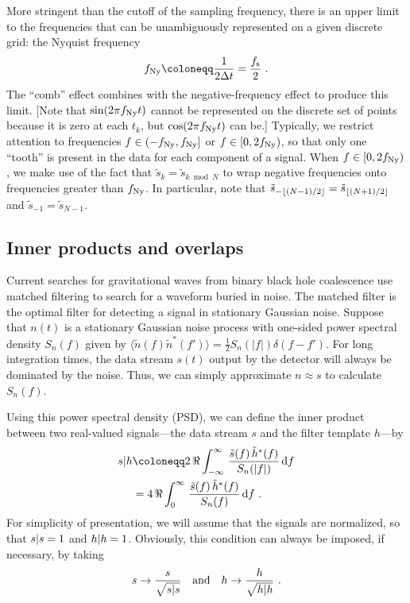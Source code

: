 \documentclass[aps, prd, amsfonts, amssymb, amsmath, %
nofootinbib]{revtex4}
\begin{document}
More stringent than the cutoff of the sampling frequency, there is an
upper limit to the frequencies that can be unambiguously represented
on a given discrete grid: the Nyquist frequency
\begin{equation}
  \label{eq:NyquistFrequency}
  \fNy \coloneqq \frac{1}{2\Delta t} = \frac{\fsamp}{2}\ .
\end{equation}
The ``comb'' effect combines with the negative-frequency effect to
produce this limit.  [Note that $\sin(2 \pi f_{\mathrm{Ny}} t)$ cannot be
represented on the discrete set of points because it is zero at each
$t_{k}$, but $\cos(2 \pi f_{\mathrm{Ny}} t)$ can be.]  Typically, we restrict
attention to frequencies $f \in (-f_{\mathrm{Ny}}, f_{\mathrm{Ny}}]$ or $f \in [0, 2f_{\mathrm{Ny}})$,
so that only one ``tooth'' is present in the data for each component
of a signal.  When $f \in [0, 2f_{\mathrm{Ny}})$, we make use of the fact that
$\tilde{s}_{k} = \tilde{s}_{k \bmod N}$ to wrap negative frequencies
onto frequencies greater than $f_{\mathrm{Ny}}$.  In particular, note that
$\tilde{s}_{-\left\lfloor{(N-1)/2}\right\rfloor} = \tilde{s}_{\left\lfloor{(N+1)/2}\right\rfloor}$ and
$\tilde{s}_{-1} = \tilde{s}_{N-1}$.


\subsection{Inner products and overlaps}
\label{sec:InnerProductsAndOverlaps}

Current searches for gravitational waves from binary black hole
coalescence use matched filtering to search for a waveform buried in
noise.  The matched filter is the optimal filter for detecting a
signal in stationary Gaussian noise.  Suppose that $n(t)$ is a
stationary Gaussian noise process with one-sided power spectral
density $S_n(f)$ given by $\langle \tilde{n}(f) \tilde{n}^\ast(f')
\rangle=\frac{1}{2} S_n(|f|)\delta(f-f')$.  For long integration
times, the data stream $s(t)$ output by the detector will always be
dominated by the noise.  Thus, we can simply approximate $n \approx s$
to calculate $S_{n}(f)$.

Using this power spectral density (PSD), we can define the inner
product between two real-valued signals---the data stream $s$ and the
filter template $h$---by
\begin{subequations}
  \label{eq:InnerProduct}
  \begin{align}
    \InnerProduct{s|h} &\coloneqq 2\, \Re \int_{-\infty}^{\infty}\,
    \frac{\tilde{s}(f)\, \tilde{h}^{\ast}(f)}{S_{n}(\abs{f})}\, \d f
    \\ &= 4\, \Re \int_{0}^{\infty}\, \frac{\tilde{s}(f)\,
      \tilde{h}^{\ast}(f)}{S_{n}(f)}\, \d f\ .
  \end{align}
\end{subequations}
For simplicity of presentation, we will assume that the signals are
normalized, so that $\InnerProduct{s|s}=1$ and $\InnerProduct{h|h}=1$.
Obviously, this condition can always be imposed, if necessary, by
taking
\begin{equation}
  \label{eq:NormalizedWaveforms}
  s \to \frac{s}{\sqrt{\InnerProduct{s|s}}} \quad \text{and} \quad h
  \to \frac{h}{\sqrt{\InnerProduct{h|h}}}\ .
\end{equation}
\end{document}
